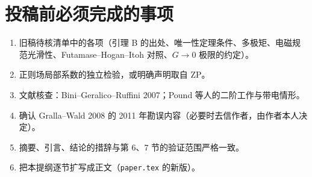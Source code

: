\documentclass[11pt,a4paper]{ctexart}
\begin{document}
\section*{投稿前必须完成的事项}
\begin{enumerate}[nosep]
\item 旧稿待核清单中的各项（引理 B 的出处、唯一性定理条件、多极矩、电磁规范光滑性、Futamase--Hogan--Itoh 对照、$G\to0$ 极限的约定）。
\item 正则场局部系数的独立检验，或明确声明取自 ZP。
\item 文献核查：Bini--Geralico--Ruffini 2007；Pound 等人的二阶工作与带电情形。
\item 确认 Gralla--Wald 2008 的 2011 年勘误内容（必要时去信作者，由作者本人决定）。
\item 摘要、引言、结论的措辞与第 6、7 节的验证范围严格一致。
\item 把本提纲逐节扩写成正文（\texttt{paper.tex} 的新版）。
\end{enumerate}
\end{document}
